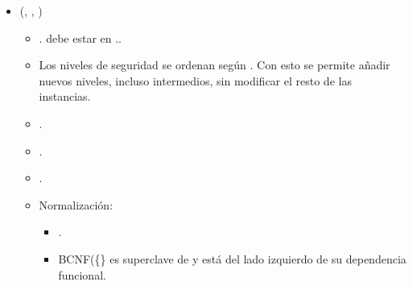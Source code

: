 \begin{itemize}
    \item {}(, , )
        \begin{itemize}
            \item {}. debe estar en 
                ..
            \item Los niveles de seguridad se ordenan según . Con 
                esto se permite añadir nuevos niveles, incluso intermedios, sin
                modificar el resto de las instancias.
            \item {}.
            \item {}.
            \item \FK{$\emptyset$}.
            \item Normalización:
                \begin{itemize}
                    \item {}.
                    \item BCNF(\{\} es superclave de 
                         y está del lado izquierdo de su 
                        dependencia funcional.
                \end{itemize}
        \end{itemize}
        

\end{itemize}
